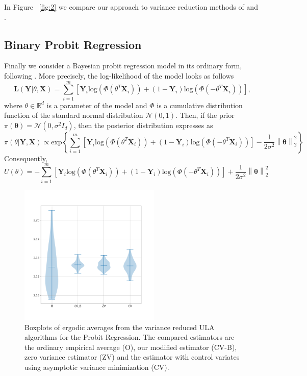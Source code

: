 \documentclass[bj]{imsart}
\begin{document}
In Figure ~\ref{fig:2} we compare our approach to variance reduction methods of \cite{mira2013zero} and \cite{brosse2018diffusion}.

\subsection{Binary Probit Regression}

Finally we consider a Bayesian probit regression model in its ordinary form, following \cite{mira2013zero}. More precisely, the log-likelihood of the model looks as follows
\begin{equation*}
    \mathbf{L}(\mathbf{Y}| \theta, \mathbf{X}) = \sum_{i=1}^{m} \left[ \mathbf{Y}_i \text{log} (\Phi(\theta^T \mathbf{X}_i)) + (1-\mathbf{Y}_i) \text{log}(\Phi(-\theta^T \mathbf{X}_i))\right],
\end{equation*}
where $\theta \in \mathbb{R}^d$ is a parameter of the model and $\Phi$ is a cumulative distribution function of the standard normal distribution $\mathcal{N}(0,1)$. Then, if the prior $\pi(\mathbf{\theta}) = \mathcal{N}(0, \sigma^2 I_d)$, then the posterior distribution expresses as
\begin{equation*}
    \pi(\theta | \mathbf{Y}, \mathbf{X})  \propto \text{exp} \left\{\sum_{i=1}^{m} \left[\mathbf{Y}_i \text{log} (\Phi(\theta^T \mathbf{X}_i)) + (1-\mathbf{Y}_i) \text{log}(\Phi(-\theta^T \mathbf{X}_i))\right]- \frac{1}{2\sigma^2} \left\| \mathbf{\theta}\right\|_2^2  \right\}
\end{equation*}
Consequently,
\begin{equation*}
    U(\theta) =  - \sum_{i=1}^{m} \left[\mathbf{Y}_i \text{log} (\Phi(\theta^T \mathbf{X}_i)) + (1-\mathbf{Y}_i) \text{log}(\Phi(-\theta^T \mathbf{X}_i))\right] + \frac{1}{2\sigma^2} \left\| \mathbf{\theta}\right\|_2^2
\end{equation*}

\begin{figure}[h]
\begin{center}
\includegraphics[width=0.6\textwidth]{../pictures/Probit_banknotes_4d.png}
\caption{Boxplots of ergodic averages  from the variance reduced ULA algorithms for the Probit Regression. The compared estimators are the ordinary empirical average  (O), our modified estimator (CV-B), zero variance estimator (ZV) and the estimator with control variates using asymptotic variance minimization (CV).
 \label{fig:3}}
\end{center}
\end{figure}
\end{document}
